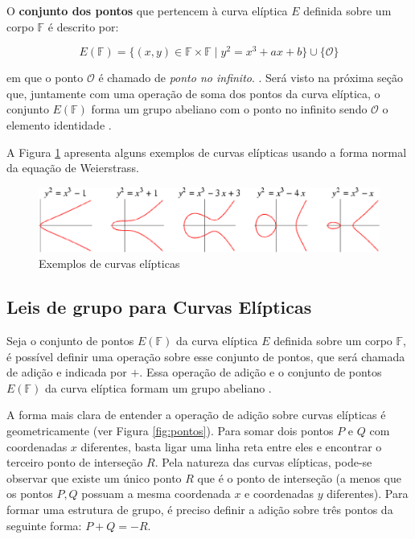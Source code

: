 O \textbf{conjunto dos pontos} que pertencem à curva elíptica \(E\) definida sobre um corpo \(\mathbb{F}\) é descrito por:

\begin{equation}
E(\mathbb{F}) = \{(x,y) \in \mathbb{F} \times \mathbb{F} \mid y^2 = x^3 + ax + b\} \cup \{\mathcal{O}\}
\label{eq:pontosCurva}
\end{equation}

em que o ponto $\mathcal{O}$ é chamado de \textit{ponto no infinito}. \cite{Mandy:2007}. Será visto na próxima seção que, juntamente com uma operação de soma dos pontos da curva elíptica, o conjunto $E(\mathbb{F})$ forma um grupo abeliano com o ponto no infinito sendo $\mathcal{O}$ o elemento identidade \cite{Guide}.

A Figura \ref{fig:curvas} apresenta alguns exemplos de curvas elípticas usando a forma normal da equação de Weierstrass.

\begin{figure}[h]
\centering
\includegraphics[scale=0.5, bb=0 0 529 101]{figuras/curvas.eps}
\caption{Exemplos de curvas elípticas}
\label{fig:curvas}
\end{figure}

%
%
\subsection{Leis de grupo para Curvas Elípticas}
Seja o conjunto de pontos $E(\mathbb{F})$ da curva elíptica \(E\) definida sobre um corpo \(\mathbb{F}\), é possível definir uma operação sobre esse conjunto de pontos, que será chamada de adição e indicada por $+$. Essa operação de adição e o conjunto de pontos $E(\mathbb{F})$ da curva elíptica formam um grupo abeliano \cite{Stallings:2011}.

A forma mais clara de entender a operação de adição sobre curvas elípticas é geometricamente (ver Figura \ref{fig:pontos}). Para somar dois pontos \(P\) e \(Q\) com coordenadas \(x\) diferentes, basta ligar uma linha reta entre eles e encontrar o terceiro ponto de interseção \(R\). Pela natureza das curvas elípticas, pode-se observar que existe um único ponto \(R\) que é o ponto de interseção (a menos que os pontos \(P, Q\) possuam a mesma coordenada $x$ e coordenadas $y$ diferentes). Para formar uma estrutura de grupo, é preciso  definir a adição sobre três pontos da seguinte forma: $P+Q=-R$. \cite{Stallings:2011}

